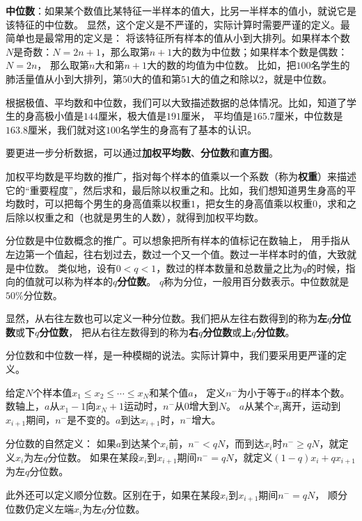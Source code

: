 \documentclass[12pt,UTF8]{ctexbook}
\begin{document}
\textbf{中位数}：如果某个数值比某特征一半样本的值大，比另一半样本的值小，就说它是该特征的中位数。
显然，这个定义是不严谨的，实际计算时需要严谨的定义。最简单也是最常用的定义是：
将该特征所有样本的值从小到大排列。如果样本个数$N$是奇数：$N = 2n + 1$，那么取第$n+1$大的数为中位数；如果样本个数是偶数：$N=2n$，
那么取第$n$大和第$n+1$大的数的均值为中位数。
比如，把$100$名学生的肺活量值从小到大排列，第$50$大的值和第$51$大的值之和除以$2$，就是中位数。

根据极值、平均数和中位数，我们可以大致描述数据的总体情况。比如，知道了学生的身高极小值是$144$厘米，极大值是$191$厘米，
平均值是$165.7$厘米，中位数是$163.8$厘米，我们就对这$100$名学生的身高有了基本的认识。

要更进一步分析数据，可以通过\textbf{加权平均数}、\textbf{分位数}和\textbf{直方图}。

加权平均数是平均数的推广，指对每个样本的值乘以一个系数（称为\textbf{权重}）来描述它的“重要程度”，然后求和，最后除以权重之和。比如，我们想知道男生身高的平均数时，可以把每个男生的身高值乘以权重$1$，把女生的身高值乘以权重$0$，求和之后除以权重之和（也就是男生的人数），就得到加权平均数。

分位数是中位数概念的推广。可以想象把所有样本的值标记在数轴上，
用手指从左边第一个值起，往右划过去，数过一个又一个值。数过一半样本时的值，大致就是中位数。
类似地，设有$0 < q < 1$，数过的样本数量和总数量之比为$q$的时候，指向的值就可以称为样本的$q$\textbf{分位数}。
$q$称为分位，一般用百分数表示。中位数就是$50\%$分位数。

显然，从右往左数也可以定义一种分位数。我们把从左往右数得到的称为\textbf{左}$q$\textbf{分位数}或\textbf{下}$q$\textbf{分位数}，
把从右往左数得到的称为\textbf{右}$q$\textbf{分位数}或\textbf{上}$q$\textbf{分位数}。

分位数和中位数一样，是一种模糊的说法。实际计算中，我们要采用更严谨的定义。

给定$N$个样本值$x_1 \leqslant x_2  \leqslant  \cdots  \leqslant x_N$和某个值$a$，
定义$n^{-}$为小于等于$a$的样本个数。
数轴上，$a$从$x_1 - 1$向$x_N + 1$运动时，$n^-$从$0$增大到$N$。
$a$从某个$x_i$离开，运动到$x_{i+1}$期间，$n^-$是不变的。$a$到达$x_{i+1}$时，$n^-$增大。

分位数的自然定义：
如果$a$到达某个$x_{i}$前，$n^- < qN$，而到达$x_{i}$时$n^- \geqslant qN$，就定义$x_{i}$为左$q$分位数。
如果在某段$x_i$到$x_{i+1}$期间$n^- = qN$，就定义$(1 - q)x_{i} + qx_{i+1}$为左$q$分位数。

此外还可以定义顺分位数。区别在于，如果在某段$x_i$到$x_{i+1}$期间$n^- = qN$，
顺分位数仍定义左端$x_i$为左$q$分位数。
\end{document}
